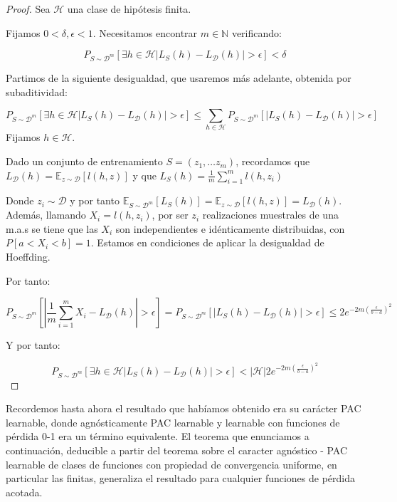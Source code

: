 \documentclass[11pt]{article}
\begin{document}
\begin{proof}
Sea $\mathcal{H}$ una clase de hipótesis finita.

Fijamos $0 < \delta, \epsilon < 1$. Necesitamos encontrar $m\in \mathbb{N}$ verificando:

\[P_{S\sim \mathcal{D}^m} [\exists h\in \mathcal{H} |L_S(h) - L_{\mathcal{D}}(h)| > \epsilon] < \delta\]

Partimos de la siguiente desigualdad, que usaremos más adelante, obtenida por subaditividad:

\[P_{S\sim \mathcal{D}^m} [\exists h\in \mathcal{H} |L_S(h) - L_{\mathcal{D}}(h)| > \epsilon] \le \sum_{h \in \mathcal{H}} P_{S\sim \mathcal{D}^m} [|L_S(h) - L_{\mathcal{D}}(h)| > \epsilon]\]
Fijamos $h \in \mathcal{H}$.

Dado un conjunto de entrenamiento $S = (z_1, \ldots z_m)$, recordamos que $L_{\mathcal{D}} (h) = \mathbb{E}_{z\sim \mathcal{D}} [l(h,z)]$ y que $L_S(h) = \frac{1}{m} \sum_{i=1}^m l(h,z_i)$

Donde $z_i \sim \mathcal{D}$ y por tanto $\mathbb{E}_{S \sim \mathcal{D}^m} [L_S(h)] = \mathbb{E}_{z \sim \mathcal{D}} [l(h,z)] = L_{\mathcal{D}} (h)$. Además, llamando $X_i = l(h,z_i)$, por ser $z_i$ realizaciones muestrales de una m.a.s se tiene que las $X_i$ son independientes e idénticamente distribuidas, con $P[a < X_i < b] = 1$. Estamos en condiciones de aplicar la desigualdad de Hoeffding.

Por tanto:

\[P_{S \sim \mathcal{D}^m} \left[\left| \frac{1}{m} \sum_{i=1}^m X_i - L_{\mathcal{D}} (h) \right| > \epsilon\right] = P_{S\sim \mathcal{D}^m} [|L_S(h) - L_{\mathcal{D}}(h)| > \epsilon] \le 2e^{-2m \left( \frac{\epsilon}{b-a} \right)^2}\]

Y por tanto:

\[P_{S\sim \mathcal{D}^m} [\exists h\in \mathcal{H} |L_S(h) - L_{\mathcal{D}}(h)| > \epsilon] < |\mathcal{H}| 2e^{-2m \left( \frac{\epsilon}{b-a} \right)^2}\]
\end{proof}

Recordemos hasta ahora el resultado que habíamos obtenido era su carácter PAC learnable, donde agnósticamente PAC learnable y learnable con funciones de pérdida 0-1 era un término equivalente. El teorema que enunciamos a continuación, deducible a partir del teorema sobre el caracter agnóstico - PAC learnable de clases de funciones con propiedad de convergencia uniforme, en particular las finitas, generaliza el resultado para cualquier funciones de pérdida acotada.
\end{document}
